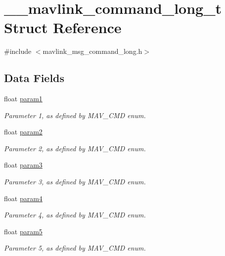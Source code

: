\hypertarget{struct____mavlink__command__long__t}{\section{\-\_\-\-\_\-mavlink\-\_\-command\-\_\-long\-\_\-t Struct Reference}
\label{struct____mavlink__command__long__t}
}


{\ttfamily \#include $<$mavlink\-\_\-msg\-\_\-command\-\_\-long.\-h$>$}

\subsection*{Data Fields}
\begin{DoxyCompactItemize}
\item 
float \hyperlink{struct____mavlink__command__long__t_a8bb82d921422fd825276bbc43502fc77}{param1}
\begin{DoxyCompactList}\small\item\em Parameter 1, as defined by M\-A\-V\-\_\-\-C\-M\-D enum. \end{DoxyCompactList}\item 
float \hyperlink{struct____mavlink__command__long__t_a715bfae8c34e8882b82efbb2bd0e580c}{param2}
\begin{DoxyCompactList}\small\item\em Parameter 2, as defined by M\-A\-V\-\_\-\-C\-M\-D enum. \end{DoxyCompactList}\item 
float \hyperlink{struct____mavlink__command__long__t_a9b11618cd6d409944727cfcc0d637f72}{param3}
\begin{DoxyCompactList}\small\item\em Parameter 3, as defined by M\-A\-V\-\_\-\-C\-M\-D enum. \end{DoxyCompactList}\item 
float \hyperlink{struct____mavlink__command__long__t_a1448f543670b7a8973c6461254cce429}{param4}
\begin{DoxyCompactList}\small\item\em Parameter 4, as defined by M\-A\-V\-\_\-\-C\-M\-D enum. \end{DoxyCompactList}\item 
float \hyperlink{struct____mavlink__command__long__t_a9c74f309b82fed5527bf1e7732424f21}{param5}
\begin{DoxyCompactList}\small\item\em Parameter 5, as defined by M\-A\-V\-\_\-\-C\-M\-D enum. \end{DoxyCompactList}\item 

\end{DoxyCompactItemize}
